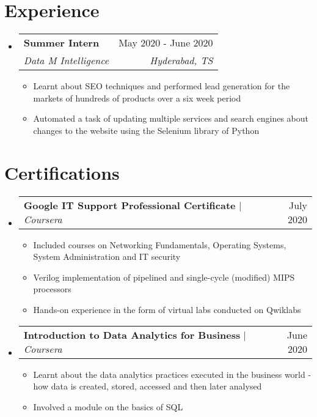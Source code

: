 \documentclass[a4paper,11pt]{article}
\makeatletter
\newcommand{\resumeItem}[1]{
  \item\small{
    {#1 \vspace{-2pt}}
  }
}
\newcommand{\resumeSubheading}[4]{
  \vspace{-2pt}\item
    \begin{tabular*}{0.97\textwidth}[t]{l@{\extracolsep{\fill}}r}
      \textbf{#1} & #2 \\
      \textit{\small#3} & \textit{\small #4} \\
    \end{tabular*}\vspace{-7pt}
}
\newcommand{\resumeSubSubheading}[2]{
    \item
    \begin{tabular*}{0.97\textwidth}{l@{\extracolsep{\fill}}r}
      \textit{\small#1} & \textit{\small #2} \\
    \end{tabular*}\vspace{-7pt}
}
\newcommand{\resumeProjectHeading}[2]{
    \item
    \begin{tabular*}{0.97\textwidth}{l@{\extracolsep{\fill}}r}
      \small#1 & #2 \\
    \end{tabular*}\vspace{-7pt}
}
\newcommand{\resumeSubHeadingListStart}{\begin{itemize}[leftmargin=0.15in, label={}]}
\newcommand{\resumeSubHeadingListEnd}{\end{itemize}}
\newcommand{\resumeItemListStart}{\begin{itemize}}
\newcommand{\resumeItemListEnd}{\end{itemize}\vspace{-5pt}}
\makeatother
\begin{document}
\section{Experience}
  \resumeSubHeadingListStart

    \resumeSubheading
      {Summer Intern}{May 2020 - June 2020}
      {Data M Intelligence}{Hyderabad, TS}
      \resumeItemListStart
        \resumeItem{Learnt about SEO techniques and performed lead generation for the markets of hundreds of products over a six week period}
        \resumeItem{Automated a task of updating multiple services and search engines about changes to the website using the Selenium library of Python}
      \resumeItemListEnd
      

  \resumeSubHeadingListEnd

\section{Certifications}
    \resumeSubHeadingListStart
      \resumeProjectHeading
          {\textbf{Google IT Support Professional Certificate} $|$ \emph{Coursera}}{July 2020}
          \resumeItemListStart
            \resumeItem{Included courses on Networking Fundamentals, Operating Systems, System Administration and IT security}
            \resumeItem{Verilog implementation of pipelined and single-cycle (modified) MIPS processors}
            \resumeItem{Hands-on experience in the form of virtual labs conducted on Qwiklabs}
          \resumeItemListEnd
      \resumeProjectHeading
          {\textbf{Introduction to Data Analytics for Business} $|$ \emph{Coursera}}{June 2020}
          \resumeItemListStart
            \resumeItem{Learnt about the data analytics practices executed in the business world - how data is created, stored, accessed and then later analysed}
            \resumeItem{Involved a module on the basics of SQL}
          \resumeItemListEnd
    \resumeSubHeadingListEnd
\end{document}
